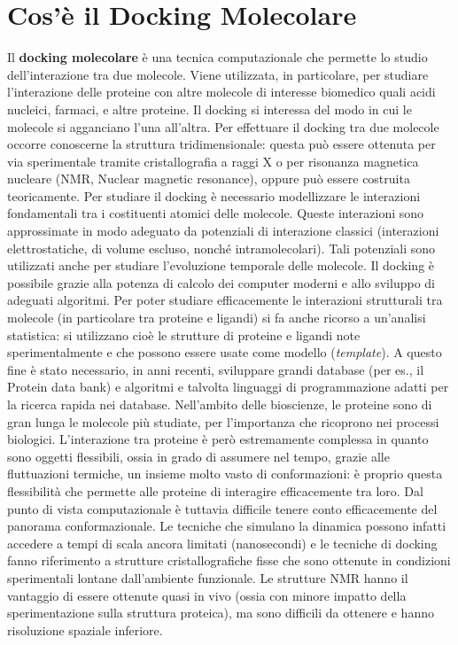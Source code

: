 \section{Cos'è il Docking Molecolare}
Il \textbf{docking molecolare} è una tecnica computazionale che permette lo studio dell’interazione tra due molecole. Viene utilizzata, in particolare, per studiare l’interazione delle proteine con altre molecole di interesse biomedico quali acidi nucleici, farmaci, e altre proteine. Il docking si interessa del modo in cui le molecole si agganciano l’una all’altra.\newline
Per effettuare il docking tra due molecole occorre conoscerne la struttura tridimensionale: questa può essere ottenuta per via sperimentale tramite cristallografia a raggi X o per risonanza magnetica nucleare (NMR, Nuclear magnetic resonance), oppure può essere costruita teoricamente. Per studiare il docking è necessario modellizzare le interazioni fondamentali tra i costituenti atomici delle molecole. Queste interazioni sono approssimate in modo adeguato da potenziali di interazione classici (interazioni elettrostatiche, di volume escluso, nonché intramolecolari). Tali potenziali sono utilizzati anche per studiare l’evoluzione temporale delle molecole.\newline 
Il docking è possibile grazie alla potenza di calcolo dei computer moderni e allo sviluppo di adeguati algoritmi. Per poter studiare efficacemente le interazioni strutturali tra molecole (in particolare tra proteine e ligandi) si fa anche ricorso a un’analisi statistica: si utilizzano cioè le strutture di proteine e ligandi note sperimentalmente e che possono essere usate come modello (\textit{template}). A questo fine è stato necessario, in anni recenti, sviluppare grandi database (per es., il Protein data bank) e algoritmi e talvolta linguaggi di programmazione adatti per la ricerca rapida nei database. Nell’ambito delle bioscienze, le proteine sono di gran lunga le molecole più studiate, per l’importanza che ricoprono nei processi biologici. L’interazione tra proteine è però estremamente complessa in quanto sono oggetti flessibili, ossia in grado di assumere nel tempo, grazie alle fluttuazioni termiche, un insieme molto vasto di conformazioni: è proprio questa flessibilità che permette alle proteine di interagire efficacemente tra loro. Dal punto di vista computazionale è tuttavia difficile tenere conto efficacemente del panorama conformazionale. Le tecniche che simulano la dinamica possono infatti accedere a tempi di scala ancora limitati (nanosecondi) e le tecniche di docking fanno riferimento a strutture cristallografiche fisse che sono ottenute in condizioni sperimentali lontane dall’ambiente funzionale. Le strutture NMR hanno il vantaggio di essere ottenute quasi in vivo (ossia con minore impatto della sperimentazione sulla struttura proteica), ma sono difficili da ottenere e hanno risoluzione spaziale inferiore.\newline
